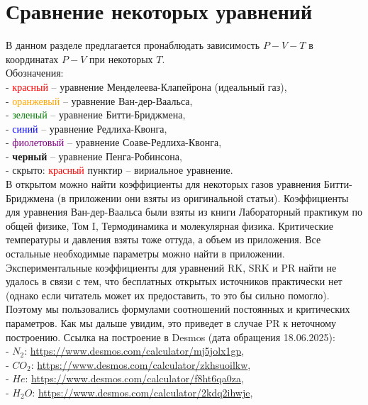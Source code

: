 \documentclass[a4paper]{article}
\numberwithin{equation}{subsection} %
\begin{document}
\section{Сравнение некоторых уравнений}
В данном разделе предлагается пронаблюдать зависимость $P-V-T$ в координатах $P-V$ при некоторых $T$.\\
Обозначения:\\
- \textcolor{red}{красный} -- уравнение Менделеева-Клапейрона (идеальный газ),\\
- \textcolor{orange}{оранжевый} -- уравнение Ван-дер-Ваальса,\\
- \textcolor{green}{зеленый} -- уравнение Битти-Бриджмена,\\
- \textcolor{blue}{синий} -- уравнение Редлиха-Квонга,\\
- \textcolor{purple}{фиолетовый} -- уравнение Соаве-Редлиха-Квонга,\\
- \textbf{черный} -- уравнение Пенга-Робинсона,\\
- скрыто: \textcolor{red}{красный} пунктир -- вириальное уравнение.\\
В открытом можно найти коэффициенты для некоторых газов уравнения Битти-Бриджмена (в приложении они взяты из оригинальной статьи). Коэффициенты для уравнения Ван-дер-Ваальса были взяты из книги Лабораторный практикум по общей физике, Том I, Термодинамика и молекулярная физика. Критические температуры и давления взяты тоже оттуда, а объем из приложения. Все остальные необходимые параметры можно найти в приложении.\\
Экспериментальные коэффициенты для уравнений RK, SRK и PR найти не удалось в связи с тем, что бесплатных открытых источников практически нет (однако если читатель может их предоставить, то это бы сильно помогло). Поэтому мы пользовались формулами соотношений постоянных и критических параметров. 
Как мы дальше увидим, это приведет в случае PR к неточному построению.
Ссылка на построение в Desmos (дата обращения 18.06.2025): \\
- $N_2$: \href{https://www.desmos.com/calculator/mj5jolx1gp}{https://www.desmos.com/calculator/mj5jolx1gp},\\
- $CO_2$: \href{https://www.desmos.com/calculator/zkhsuoilkw}{https://www.desmos.com/calculator/zkhsuoilkw},\\
- $He$: \href{https://www.desmos.com/calculator/f8ht6qa0za}{https://www.desmos.com/calculator/f8ht6qa0za},\\
- $H_2O$: \href{https://www.desmos.com/calculator/2kdq2ihwje}{https://www.desmos.com/calculator/2kdq2ihwje},\\
\end{document}
